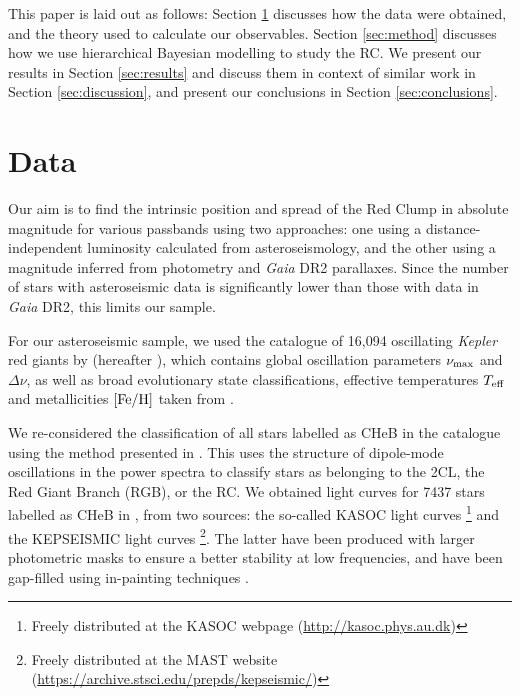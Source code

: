 \documentclass[fleqn,usenatbib]{mnras}
\newcommand{\numax}{\mbox{$\nu_{\rm max}$}\xspace}
\newcommand{\dnu}{\mbox{$\Delta \nu$}\xspace}
\newcommand{\teff}{\mbox{$T_{\rm eff}$}\xspace}
\newcommand{\feh}{\mbox{$\rm{[Fe/H]}$}\xspace}
\newcommand{\kepler}{\emph{Kepler}\xspace}
\newcommand{\gaia}{\emph{Gaia}\xspace}
\newcommand{\nnew}[1]{#1}
\newcommand{\up}[1]{#1}
\begin{document}
This paper is laid out as follows: Section \ref{sec:data} discusses how the data were obtained, and the theory used to calculate our observables. Section \ref{sec:method} discusses how we use hierarchical Bayesian modelling to study the RC. We present our results in Section \ref{sec:results} and discuss them in context of similar work in Section \ref{sec:discussion}, and present our conclusions in Section \ref{sec:conclusions}.

\section{Data} \label{sec:data}
Our aim is to find the intrinsic position and spread of the Red Clump in absolute magnitude for various passbands using two approaches: one using a distance-independent luminosity calculated from asteroseismology, and the other using a magnitude inferred from photometry and \gaia DR2 parallaxes. Since the number of stars with asteroseismic data is significantly lower than those with data in \gaia DR2, this limits our sample. 

For our asteroseismic sample, we used the catalogue of 16,094 oscillating \kepler red giants by \cite{art:yu+2018} (hereafter ), which contains global oscillation parameters \numax and \dnu, as well as broad evolutionary state classifications, effective temperatures \teff and metallicities \feh taken from \cite{art:mathur+2017}.

We \nnew{re-considered the classification of} all stars labelled as CHeB in the  catalogue using the method presented in \cite{art:elsworth+2017}. This uses the structure of dipole-mode oscillations in the power spectra to classify stars as belonging to the 2CL, the Red Giant Branch (RGB), or the RC. We obtained light curves for 7437 stars labelled as CHeB in , \up{from two sources: the so-called KASOC light curves \citep{art:handberg+lund2014}\footnote{Freely distributed at the KASOC webpage (\url{http://kasoc.phys.au.dk})} and the KEPSEISMIC light curves \citep{art:garcia+2011}\footnote{Freely distributed at the MAST website (\url{https://archive.stsci.edu/prepds/kepseismic/})}. The latter have been produced with larger photometric masks to ensure a better stability at low frequencies, and have been gap-filled using in-painting techniques \citep{art:garcia+2014, art:jofre+2015}.}
\end{document}
